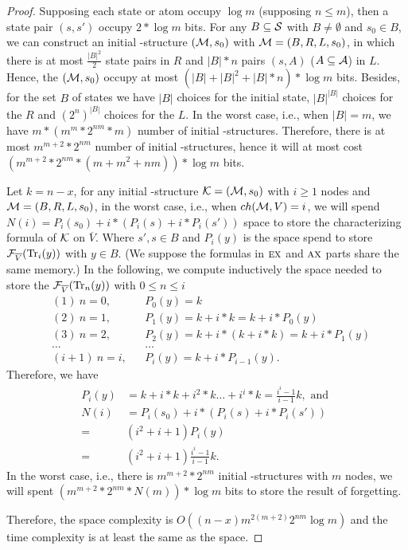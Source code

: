 \documentclass{article}
\begin{document}
\begin{proof}
Supposing each state or atom occupy $\log m$ (supposing $n\leq m$), then a state pair $(s, s')$ occupy $2* \log m$ bits.
For any $B\subseteq {\cal S}$ with $B \not = \emptyset$ and $s_0\in B$, we can construct an initial \MPK-structure $({\cal M}, s_0)$ with ${\cal M}=(B, R, L, s_0)$, in which there is at most $\frac{|B|^2}{2}$ state pairs in $R$ and $|B|*n$ pairs $(s, A)$ ($A \subseteq {\cal A}$) in $L$. Hence, the $({\cal M}, s_0)$ occupy at most $(|B|+|B|^2 + |B|*n)*\log m$ bits.
Besides, for the set $B$ of states we have $|B|$ choices for the initial state, $|B|^{|B|}$ choices for the $R$ and $(2^n)^{|B|}$ choices for the $L$. In the worst case, i.e., when $|B|=m$, we have $m*(m^m * 2^{nm} * m)$ number of initial \MPK-structures.
Therefore, there is at most $m^{m+2}*2^{nm}$ number of initial \MPK-structures, hence it will at most cost $(m^{m+2}*2^{nm}*(m+m^2+nm))*\log m$ bits.



Let $k=n-x$, for any initial \MPK-structure ${\cal K}=({\cal M}, s_0)$ with $i\geq 1$ nodes and ${\cal M}=(B, R, L, s_0)$, in the worst case, i.e., when $ch({\cal M},V)=i$, we will spend $N(i)=P_i(s_0) + i * (P_i(s) + i * P_i(s'))$ space to store the characterizing formula of ${\cal K}$ on $\overline{V}$. Where $s', s\in B$ and $P_i(y)$ is the space spend to store ${\cal F}_{\overline{V}}(\textrm{Tr}_i(y))$ with $y\in B$.
(We suppose the formulas in $\textsc{e} \textsc{x}$ and $\textsc{a} \textsc{x}$ parts share the same memory.)
In the following, we compute inductively the space needed to store the ${\cal F}_{\overline{V}}(\textrm{Tr}_n(y))$ with $0\leq n \leq i$
\begin{align*}
    & (1)\ n = 0, && P_0(y) = k\\ %
    & (2)\ n =1, && P_1(y) = k + i *k = k + i* P_0(y)\\
    & (3)\ n =2, && P_2(y) = k + i*(k + i*k) = k + i*P_1(y)\\
    & \dots && \dots\\
    & (i+1)\ n = i, && P_i(y) =k+ i *P_{i-1}(y).
\end{align*}
Therefore, we have
\begin{align*}
 P_i(y) &= k + i*k+ i^2*k\dots + i^i * k = \frac{i^i -1}{i-1} k, \text{ and }\\
 N(i)&= P_i(s_0) + i * (P_i(s) + i * P_i(s'))\\
 = & (i^2 +i +1) P_i(y)\\
 =& (i^2+i +1) \frac{i^i -1}{i-1} k.
\end{align*}
In the worst case, i.e., there is $m^{m+2}*2^{nm}$ initial \MPK-structures with $m$ nodes, we will spent $(m^{m+2}*2^{nm}*N(m))*\log m$ bits to store the result of forgetting.

Therefore, the space complexity is $O((n-x)m^{2(m+2)}2^{nm}  \log m)$ and the time complexity is at least the same as the space.
\end{proof}
\end{document}
